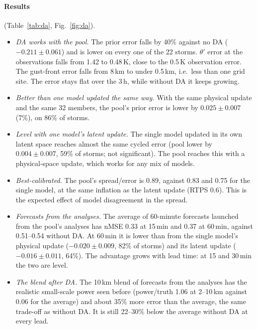 \documentclass[11pt]{article}
\begin{document}
\paragraph{Results} (Table~\ref{tab:da}, Fig.~\ref{fig:da}).
\begin{itemize}
\item \emph{DA works with the pool.} The prior error falls by 40\% against no DA ($-0.211 \pm 0.061$) and is lower on every one of the 22 storms. $\theta'$ error at the observations falls from 1.42 to 0.48\,K, close to the 0.5\,K observation error. The gust-front error falls from 8\,km to under 0.5\,km, i.e.\ less than one grid site. The error stays flat over the 3\,h, while without DA it keeps growing.
\item \emph{Better than one model updated the same way.} With the same physical update and the same 32 members, the pool's prior error is lower by $0.025 \pm 0.007$ (7\%), on 86\% of storms.
\item \emph{Level with one model's latent update.} The single model updated in its own latent space reaches almost the same cycled error (pool lower by $0.004 \pm 0.007$, 59\% of storms; not significant). The pool reaches this with a physical-space update, which works for any mix of models.
\item \emph{Best-calibrated.} The pool's spread/error is 0.89, against 0.83 and 0.75 for the single model, at the same inflation as the latent update (RTPS 0.6). This is the expected effect of model disagreement in the spread.
\item \emph{Forecasts from the analyses.} The average of 60-minute forecasts launched from the pool's analyses has nMSE 0.33 at 15\,min and 0.37 at 60\,min, against 0.51--0.54 without DA. At 60\,min it is lower than from the single model's physical update ($-0.020 \pm 0.009$, 82\% of storms) and its latent update ($-0.016 \pm 0.011$, 64\%). The advantage grows with lead time: at 15 and 30\,min the two are level.
\item \emph{The blend after DA.} The 10\,km blend of forecasts from the analyses has the realistic small-scale power seen before (power/truth 1.06 at 2--10\,km against 0.06 for the average) and about 35\% more error than the average, the same trade-off as without DA. It is still 22--30\% below the average without DA at every lead.
\end{itemize}
\end{document}
